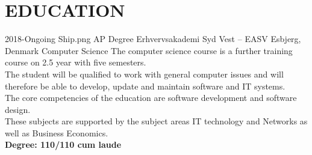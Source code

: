 \section*{{\faGraduationCap} EDUCATION}
\MySection
{2018-Ongoing}
{Ship.png}
{AP Degree}
{Erhvervsakademi Syd Vest -- EASV}
{Esbjerg, Denmark}
{Computer Science}
{ The computer science course is a further training course on 2.5 year with five semesters.\\
The student will be qualified to work with general computer issues and will therefore be able to develop, update and maintain software and IT systems.\\
The core competencies of the education are software development and software design.\\
These subjects are supported by the subject areas IT technology and Networks as well as Business Economics.
\\\textbf{Degree: 110/110 cum laude}}
\vspace*{0.22cm}